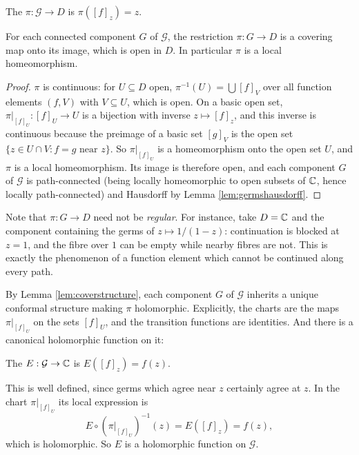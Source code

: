 \documentclass[a4paper]{scrartcl}
\begin{document}
\begin{definition}
	The  $\pi : \mathcal{G} \to D$ is $\pi([f]_z) = z$.
\end{definition}

\begin{lemma}\label{lem:germscover}
	For each connected component $G$ of $\mathcal{G}$, the restriction $\pi : G \to D$ is a
	covering map onto its image, which is open in $D$. In particular $\pi$ is a local
	homeomorphism.
\end{lemma}

\begin{proof}
	$\pi$ is continuous: for $U \subseteq D$ open, $\pi^{-1}(U) = \bigcup [f]_{V}$ over all
	function elements $(f,V)$ with $V \subseteq U$, which is open. On a basic open set,
	$\pi|_{[f]_U} : [f]_U \to U$ is a bijection with inverse $z \mapsto [f]_z$, and this
	inverse is continuous because the preimage of a basic set $[g]_V$ is the open set
	$\{z \in U \cap V : f = g \text{ near } z\}$. So $\pi|_{[f]_U}$ is a homeomorphism onto
	the open set $U$, and $\pi$ is a local homeomorphism. Its image is therefore open, and
	each component $G$ of $\mathcal{G}$ is path-connected (being locally homeomorphic to
	open subsets of $\mathbb{C}$, hence locally path-connected) and Hausdorff by Lemma
	\ref{lem:germshausdorff}.
\end{proof}

\begin{remark}
	Note that $\pi : G \to D$ need not be \emph{regular}. For instance, take $D = \mathbb{C}$ and
	the component containing the germs of $z \mapsto 1/(1-z)$: continuation is blocked at
	$z=1$, and the fibre over $1$ can be empty while nearby fibres are not. This is exactly
	the phenomenon of a function element which cannot be continued along every path.
\end{remark}

By Lemma \ref{lem:coverstructure}, each component $G$ of $\mathcal{G}$ inherits a unique
conformal structure making $\pi$ holomorphic. Explicitly, the charts are the maps
$\pi|_{[f]_U}$ on the sets $[f]_U$, and the transition functions are identities. And
there is a canonical holomorphic function on it:

\begin{definition}
	The  $E : \mathcal{G} \to \mathbb{C}$ is $E([f]_z) = f(z)$.
\end{definition}

This is well defined, since germs which agree near $z$ certainly agree at $z$. In the
chart $\pi|_{[f]_U}$ its local expression is
$$
E \circ (\pi|_{[f]_U})^{-1}(z) = E([f]_z) = f(z),
$$
which is holomorphic. So $E$ is a holomorphic function on $\mathcal{G}$.
\end{document}
